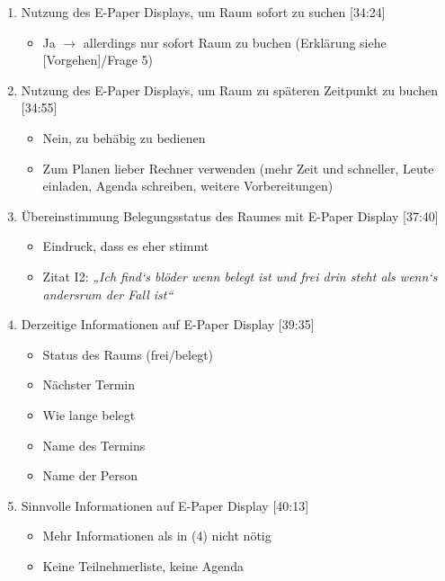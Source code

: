 \begin{enumerate}

    \item Nutzung des E-Paper Displays, um Raum sofort zu suchen [34:24]
     \begin{itemize}
        \item Ja $\rightarrow$ allerdings nur sofort Raum zu buchen (Erklärung siehe [Vorgehen]/Frage 5)
    \end{itemize}

    \item Nutzung des E-Paper Displays, um Raum zu späteren Zeitpunkt zu buchen [34:55]
     \begin{itemize}
        \item Nein, zu behäbig zu bedienen
        \item Zum Planen lieber Rechner verwenden (mehr Zeit und schneller, Leute einladen, Agenda schreiben, weitere Vorbereitungen)
    \end{itemize}

    \item Übereinstimmung Belegungsstatus des Raumes mit E-Paper Display [37:40] 
     \begin{itemize}
        \item Eindruck, dass es eher stimmt
        \item Zitat I2: \textit{„Ich find‘s blöder wenn belegt ist und frei drin steht als wenn‘s andersrum der Fall ist“}
    \end{itemize}

    \item Derzeitige Informationen auf E-Paper Display [39:35]
     \begin{itemize}
        \item Status des Raums (frei/belegt)
        \item Nächster Termin
        \item Wie lange belegt
        \item Name des Termins
        \item Name der Person
    \end{itemize}

    \item Sinnvolle Informationen auf E-Paper Display [40:13]
     \begin{itemize}
        \item Mehr Informationen als in (4) nicht nötig
        \item Keine Teilnehmerliste, keine Agenda
    \end{itemize}
    
\end{enumerate}

